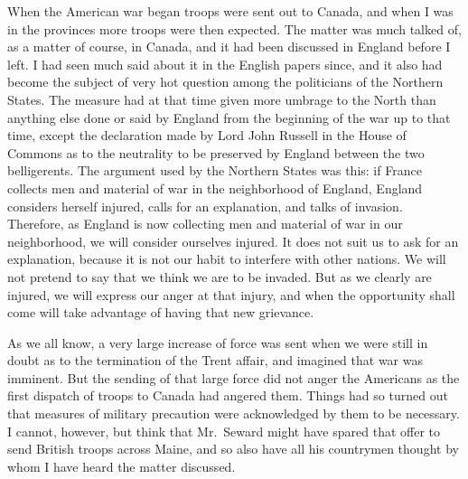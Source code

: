 When the American war began troops were sent out to Canada, and
when I was in the provinces more troops were then expected.  The
matter was much talked of, as a matter of course, in Canada, and it
had been discussed in England before I left.  I had seen much said
about it in the English papers since, and it also had become the
subject of very hot question among the politicians of the Northern
States.  The measure had at that time given more umbrage to the
North than anything else done or said by England from the beginning
of the war up to that time, except the declaration made by Lord
John Russell in the House of Commons as to the neutrality to be
preserved by England between the two belligerents.  The argument
used by the Northern States was this: if France collects men and
material of war in the neighborhood of England, England considers
herself injured, calls for an explanation, and talks of invasion.
Therefore, as England is now collecting men and material of war in
our neighborhood, we will consider ourselves injured.  It does not
suit us to ask for an explanation, because it is not our habit to
interfere with other nations.  We will not pretend to say that we
think we are to be invaded.  But as we clearly are injured, we will
express our anger at that injury, and when the opportunity shall
come will take advantage of having that new grievance.

As we all know, a very large increase of force was sent when we
were still in doubt as to the termination of the Trent affair, and
imagined that war was imminent.  But the sending of that large
force did not anger the Americans as the first dispatch of troops
to Canada had angered them.  Things had so turned out that measures
of military precaution were acknowledged by them to be necessary.
I cannot, however, but think that Mr.\ Seward might have spared that
offer to send British troops across Maine, and so also have all his
countrymen thought by whom I have heard the matter discussed.


